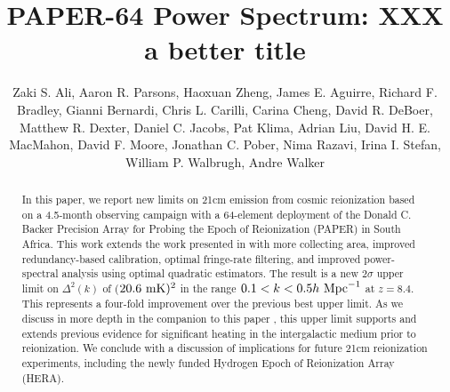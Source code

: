 \documentclass[twocolumn,numberedappendix]{emulateapj} \shorttitle{PSA64}
\newcommand{\hMpci}{h\ {\rm Mpc}^{-1}}
\begin{document}
\title{PAPER-64 Power Spectrum: XXX a better title}

\author{
Zaki S. Ali, 
Aaron R. Parsons, 
Haoxuan Zheng,
James E. Aguirre,
Richard F. Bradley,
Gianni Bernardi, 
Chris L. Carilli,
Carina Cheng,
David R. DeBoer, 
Matthew R. Dexter,
Daniel C. Jacobs, 
Pat Klima,
Adrian Liu, 
David H. E. MacMahon,
David F. Moore,
Jonathan C. Pober, 
Nima Razavi,
Irina I. Stefan,
William P. Walbrugh,
Andre Walker
}


\begin{abstract}
In this paper, we report new limits on 21cm emission from cosmic reionization
based on a 4.5-month observing campaign with a 64-element deployment of the
Donald C. Backer Precision Array for Probing the Epoch of Reionization (PAPER)
in South Africa.  This work extends the work presented in
\citet{parsons_et_al2014} with more collecting area, improved redundancy-based
calibration, optimal fringe-rate filtering, and improved power-spectral
analysis using optimal quadratic estimators. The result is a new $2\sigma$
upper limit on $\Delta^2(k)$ of ($20.6~{\rm mK})^2$ in the range
$0.1<k<0.5\hMpci$ at $z=8.4$.  This represents a four-fold improvement over the
previous best upper limit.  As we discuss in more depth in the companion to
this paper \citet{pober_et_al2015}, this upper limit supports and extends
previous evidence for significant heating in the intergalactic medium prior to
reionization. We conclude with a discussion of implications for future 21cm
reionization experiments, including the newly funded Hydrogen Epoch of
Reionization Array (HERA).  
\end{abstract}
\end{document}
